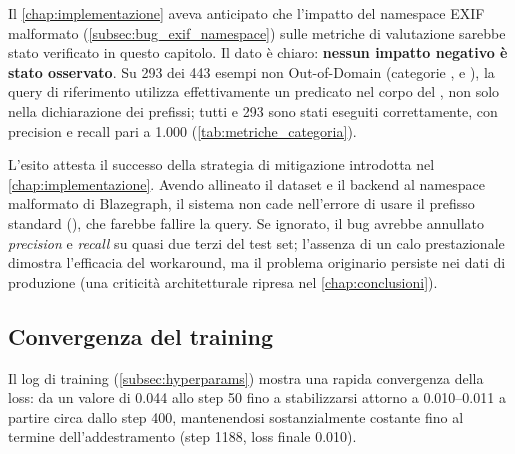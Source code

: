 Il \cref{chap:implementazione} aveva anticipato che l'impatto del namespace EXIF malformato (\cref{subsec:bug_exif_namespace}) sulle metriche di valutazione sarebbe stato verificato in questo capitolo. Il dato è chiaro: \textbf{nessun impatto negativo è stato osservato}. Su 293 dei 443 esempi non Out-of-Domain (categorie ,  e ), la query di riferimento utilizza effettivamente un predicato  nel corpo del , non solo nella dichiarazione dei prefissi; tutti e 293 sono stati eseguiti correttamente, con precision e recall pari a 1.000 (\cref{tab:metriche_categoria}).

L'esito attesta il successo della strategia di mitigazione introdotta nel \cref{chap:implementazione}. Avendo allineato il dataset e il backend al namespace malformato di Blazegraph, il sistema non cade nell'errore di usare il prefisso standard (), che farebbe fallire la query. Se ignorato, il bug avrebbe annullato \textit{precision} e \textit{recall} su quasi due terzi del test set; l'assenza di un calo prestazionale dimostra l'efficacia del workaround, ma il problema originario persiste nei dati di produzione (una criticità architetturale ripresa nel \cref{chap:conclusioni}).

\subsection{Convergenza del training}\label{subsec:convergenza}

Il log di training (\cref{subsec:hyperparams}) mostra una rapida convergenza della loss: da un valore di 0.044 allo step 50 fino a stabilizzarsi attorno a 0.010--0.011 a partire circa dallo step 400, mantenendosi sostanzialmente costante fino al termine dell'addestramento (step 1188, loss finale 0.010).

